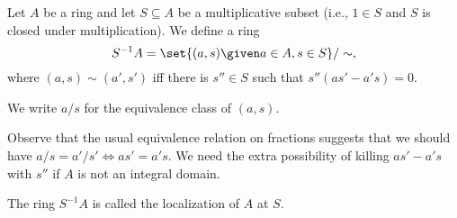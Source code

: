 Let $A$ be a ring and let $S \subseteq A$ be a multiplicative subset (i.e., $1 \in S$ and
$S$ is closed under multiplication). We define a ring
\[ S^{-1}A = \set{(a, s)\given a \in A, s \in S}/\sim, \]
where $(a, s) \sim (a', s')$ iff there is $s'' \in S$ such that
$s''(as'-a's) = 0$.

We write $a/s$ for the equivalence class of $(a, s)$.

Observe that the usual equivalence relation on fractions suggests that we should
have $a/s = a'/s' \iff as' = a's$. We need the extra possibility of killing
$as'-a's$ with $s''$ if $A$ is not an integral domain.

The ring $S^{-1}A$ is called the localization of $A$ at $S$.
